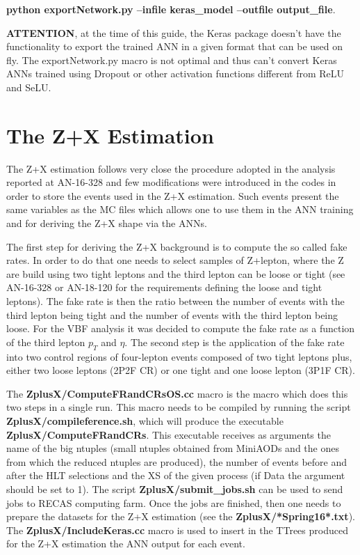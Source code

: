 \documentclass[]{report}
\begin{document}
\textbf{python exportNetwork.py --infile keras\_model --outfile output\_file}.

{\color{red}\textbf{ATTENTION}}, at the time of this guide, the Keras package doesn't have the functionality to export the trained ANN in a given format that can be used on fly. The exportNetwork.py macro is not optimal and thus can't convert Keras ANNs trained using Dropout or other activation functions different from ReLU and SeLU.

\section{The Z+X Estimation}
The Z+X estimation follows very close the procedure adopted in the analysis reported at AN-16-328 and few modifications were introduced in the codes in order to store the events used in the Z+X estimation. Such events present the same variables as the MC files which allows one to use them in the ANN training and for deriving the Z+X shape via the ANNs.

The first step for deriving the Z+X background is to compute the so called fake rates. In order to do that one needs to select samples of Z+lepton, where the Z are build using two tight leptons and the third lepton can be loose or tight (see AN-16-328 or AN-18-120 for the requirements defining the loose and tight leptons). The fake rate is then the ratio between the number of events with the third lepton being tight and the number of events with the third lepton being loose. For the VBF analysis it was decided to compute the fake rate as a function of the third lepton $p_{T}$ and $\eta$. The second step is the application of the fake rate into two control regions of four-lepton events composed of two tight leptons plus, either two loose leptons (2P2F CR) or one tight and one loose lepton (3P1F CR).

The \textbf{ZplusX/ComputeFRandCRsOS.cc} macro is the macro which does this two steps in a single run. This macro needs to be compiled by running the script \textbf{ZplusX/compileference.sh}, which will produce the executable \textbf{ZplusX/ComputeFRandCRs}. This executable receives as arguments the name of the big ntuples (small ntuples obtained from MiniAODs and the ones from which the reduced ntuples are produced), the number of events before and after the HLT selections and the XS of the given process (if Data the argument should be set to 1). The script \textbf{ZplusX/submit\_jobs.sh} can be used to send jobs to RECAS computing farm. Once the jobs are finished, then one needs to prepare the datasets for the Z+X estimation (see the \textbf{ZplusX/*Spring16*.txt}). The \textbf{ZplusX/IncludeKeras.cc} macro is used to insert in the TTrees produced for the Z+X estimation the ANN output for each event. 
\end{document}
